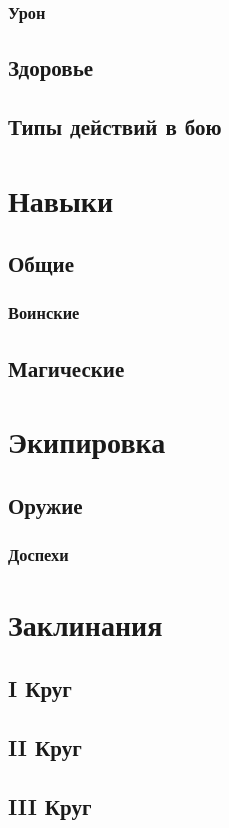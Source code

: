 \documentclass[10pt,twoside,twocolumn,openany]{book}
\begin{document}
\subsubsection{Урон}
\lipsum[1]
\subsection{Здоровье}
\lipsum[1]
\subsection{Типы действий в бою}
\lipsum[1]

\newpage
\section{Навыки}
\lipsum[1]
\subsection{Общие}
\lipsum[1]
\subsubsection{Воинские}
\lipsum[1]
\subsection{Магические}
\lipsum[1]

\newpage
\section{Экипировка}
\lipsum[1]
\subsection{Оружие}
\lipsum[1]
\subsubsection{Доспехи}
\lipsum[1]

\clearpage
\section{Заклинания}
\lipsum[1]
\subsection{\textrm{I} Круг}
\lipsum[1]
\subsection{\textrm{II} Круг}
\lipsum[1]
\subsection{\textrm{III} Круг}
\lipsum[1]
\end{document}

